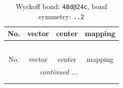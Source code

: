 \documentclass[fleqn,8pt]{jsarticle}
\begin{document}
\renewcommand{\arraystretch}{1.2}
\begin{longtable}{cccc}
\caption{Wyckoff bond: {\tt 48d@24c}, bond symmetry: {\tt ..2}}
 \\
 \hline \hline
No. & vector & center & mapping \\ \hline \endfirsthead

\multicolumn{3}{l}{\tablename\ \thetable{}} \\
 \hline \hline
No. & vector & center & mapping \\ \hline \endhead

 \hline \hline
\multicolumn{3}{r}{\footnotesize\it continued ...} \\ \endfoot

 \hline \hline
\multicolumn{3}{r}{} \\ \endlastfoot


\end{longtable}
\end{document}
